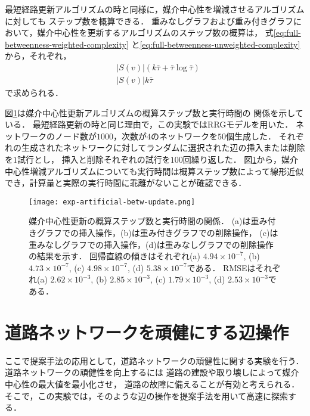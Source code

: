最短経路更新アルゴリズムの時と同様に，媒介中心性を増減させるアルゴリズムに対しても
ステップ数を概算できる．
重みなしグラフおよび重み付きグラフにおいて，媒介中心性を更新するアルゴリズムのステップ数の概算は，
式\eqref{eq:full-betweenness-weighted-complexity}
と\eqref{eq:full-betweenness-unweighted-complexity}から，それぞれ，
\begin{align}
  &|S(v)|(k\bar{\tau}+\bar{\tau}\log\bar{\tau})
  \label{eq:pred-betw-steps-weighted} \\
  &|S(v)|k\bar{\tau}
  \label{eq:pred-betw-steps-unweighted}
\end{align}
で求められる．

図\ref{fig:exp-artificial-betw-update}は媒介中心性更新アルゴリズムの概算ステップ数と実行時間の
関係を示している．
最短経路更新の時と同じ理由で，この実験ではRRGモデルを用いた．
ネットワークのノード数が$1000$，次数が$4$のネットワークを$50$個生成した．
それぞれの生成されたネットワークに対してランダムに選択された辺の挿入または削除を$1$試行とし，
挿入と削除それぞれの試行を$100$回繰り返した．
図\ref{fig:exp-artificial-betw-update}から，媒介中心性増減アルゴリズムについても実行時間は概算ステップ数によって線形近似でき，計算量と実際の実行時間に乖離がないことが確認できる．

\begin{figure}
  \centering
  \texttt{[image: exp-artificial-betw-update.png]}
  \caption{
    媒介中心性更新の概算ステップ数と実行時間の関係．
    (a)は重み付きグラフでの挿入操作，(b)は重み付きグラフでの削除操作，
    (c)は重みなしグラフでの挿入操作，(d)は重みなしグラフでの削除操作の結果を示す．
    回帰直線の傾きはそれぞれ(a) $4.94\times10^{-7}$, (b) $4.73\times10^{-7}$,
    (c) $4.98\times10^{-7}$, (d) $5.38\times10^{-7}$である．
    RMSEはそれぞれ(a) $2.62\times10^{-3}$, (b) $2.85\times10^{-3}$,
    (c) $1.79\times10^{-3}$, (d) $2.53\times10^{-3}$である．
  }
  \label{fig:exp-artificial-betw-update}
\end{figure}

\section{道路ネットワークを頑健にする辺操作}

ここで提案手法の応用として，道路ネットワークの頑健性に関する実験を行う．
道路ネットワークの頑健性を向上するには
道路の建設や取り壊しによって媒介中心性の最大値を最小化させ，
道路の故障に備えることが有効と考えられる．
そこで，この実験では，そのような辺の操作を提案手法を用いて高速に探索する．

